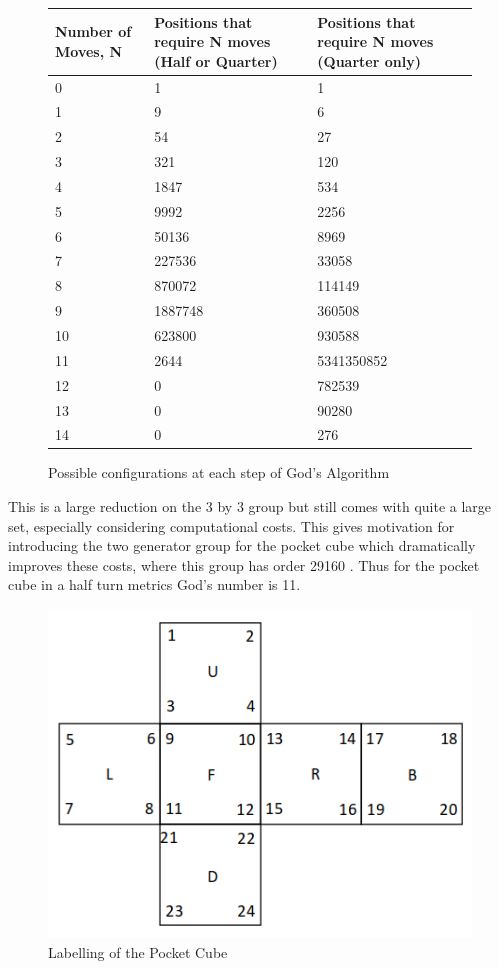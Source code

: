 \documentclass{article}
\begin{document}
\begin{figure}
\begin{center}
    \begin{tabular}{ | p{3cm} | p{6cm}| p{6cm} |}
    \hline
    Number of Moves, N  & Positions that require N moves (Half or Quarter) & Positions that require N moves (Quarter only) \\ \hline
     0 & 1 & 1\\ \hline
     1 & 9 & 6\\ \hline
     2 & 54 & 27\\ \hline
     3 & 321 & 120\\ \hline
     4 & 1847 & 534\\ \hline
     5 & 9992 & 2256\\ \hline
     6 & 50136 & 8969\\ \hline
     7 & 227536 & 33058\\ \hline
     8 & 870072 & 114149\\ \hline
     9 & 1887748 & 360508\\ \hline
     10 & 623800 & 930588\\ \hline
     11 & 2644 & 5341350852\\ \hline
     12 & 0 & 782539\\ \hline
     13 & 0 & 90280\\ \hline
     14 & 0 & 276\\ \hline
    \end{tabular}
\end{center}
\caption{Possible configurations at each step of God's Algorithm}
\label{:thistletab}
\end{figure}
This is a large reduction on the 3 by 3 group but still comes with quite a large set, especially considering computational costs. This gives motivation for introducing the two generator group for the pocket cube which dramatically improves these costs, where this group has order 29160 \cite{bandelow2012inside}. Thus for the pocket cube in a half turn metrics God's number is 11.

\begin{figure}[h]
\includegraphics[scale=.5]{2by2.png}
\caption{Labelling of the Pocket Cube}
\label{fig:2labelling}
\end{figure}\paragraph{}
\newpage
\end{document}
